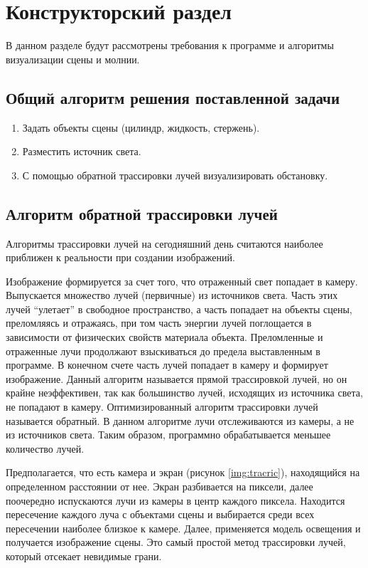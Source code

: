 \chapter{Конструкторский раздел}

В данном разделе будут рассмотрены требования к программе и алгоритмы визуализации сцены и молнии.


\section{Общий алгоритм решения поставленной задачи}
\begin{enumerate}
	\item Задать объекты сцены (цилиндр, жидкость, стержень).
	\item Разместить источник света.
	\item С помощью обратной трассировки лучей визуализировать обстановку.
\end{enumerate}


\section{Алгоритм обратной трассировки лучей}


Алгоритмы трассировки лучей на сегодняшний день считаются наиболее приближен к реальности при создании изображений. 

Изображение формируется за счет того, что отраженный свет попадает в камеру. Выпускается множество лучей (первичные) из источников света. Часть этих лучей “улетает” в свободное пространство, а часть попадает на объекты сцены, преломляясь и отражаясь, при том часть энергии лучей поглощается в зависимости от физических свойств материала объекта. Преломленные и отраженные лучи продолжают взыскиваться до предела выставленным в программе. В конечном счете часть лучей попадает в камеру и формирует изображение.
Данный алгоритм называется прямой трассировкой лучей, но он крайне неэффективен, так как большинство лучей, исходящих из источника света, не попадают в камеру. 
Оптимизированный алгоритм трассировки лучей называется обратный. В данном алгоритме лучи отслеживаются из камеры, а не из источников света. Таким образом, программно обрабатывается меньшее количество лучей.

Предполагается, что есть камера и экран (рисунок \ref{img:tracric}), находящийся на определенном расстоянии от нее. Экран разбивается на пиксели, далее поочередно испускаются лучи из камеры в центр каждого пиксела. Находится пересечение каждого луча с объектами сцены и выбирается среди всех пересечении наиболее близкое к камере. Далее, применяется модель освещения и получается изображение сцены. Это самый простой метод трассировки лучей, который отсекает невидимые грани.


